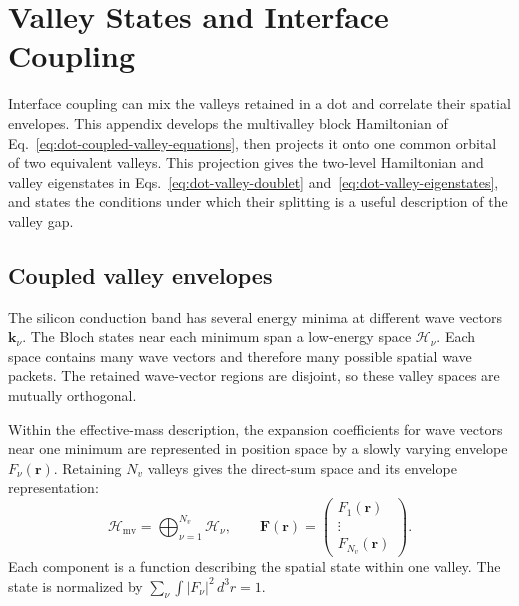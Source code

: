 \FloatBarrier
\section{Valley States and Interface Coupling}
\label{app:valley-states}
\label{sec:device-orbital-valley}

Interface coupling can mix the valleys retained in a dot and correlate
their spatial envelopes. This appendix develops the multivalley block
Hamiltonian of Eq.~\eqref{eq:dot-coupled-valley-equations}, then projects it
onto one common orbital of two equivalent valleys. This projection
gives the two-level Hamiltonian and valley eigenstates in
Eqs.~\eqref{eq:dot-valley-doublet} and~\eqref{eq:dot-valley-eigenstates},
and states the conditions under which their splitting is a useful
description of the valley gap.

\subsection{Coupled valley envelopes}
\label{sec:device-coupled-valley-envelopes}

The silicon conduction band has several energy minima at different
wave vectors $\mathbf k_\nu$. The Bloch states near each minimum
span a low-energy space $\mathcal H_\nu$. Each space contains many
wave vectors and therefore many possible spatial wave packets.
The retained wave-vector regions are disjoint, so these valley
spaces are mutually orthogonal.

Within the effective-mass description, the expansion coefficients
for wave vectors near one minimum are represented in position space
by a slowly varying envelope $F_\nu(\mathbf r)$. Retaining $N_v$
valleys gives the direct-sum space and its envelope representation:
\begin{equation}
 \mathcal H_{\mathrm{mv}}
       =\bigoplus_{\nu=1}^{N_v}\mathcal H_\nu,
 \qquad
 \mathbf F(\mathbf r)
       =\begin{pmatrix}F_1(\mathbf r)\\ \vdots\\F_{N_v}(\mathbf r)\end{pmatrix}.
 \label{eq:device-valley-space}
\end{equation}
Each component is a function describing the spatial state within
one valley. The state is normalized by
$\sum_\nu\int |F_\nu|^2\,d^3r=1$.

